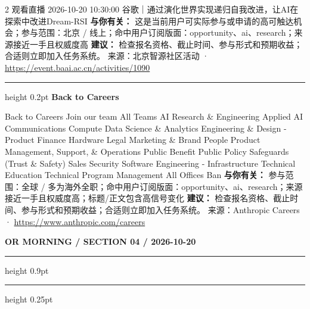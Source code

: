 \documentclass[10.5pt]{ctexart}
\begin{document}
\begin{multicols}{2}
观看直播 2026-10-20 10:30:00 谷歌｜通过演化世界实现递归自我改进，让AI在探索中改进Dream-RSI
\textbf{与你有关：} 这是当前用户可实际参与或申请的高可触达机会；参与范围：北京 / 线上；命中用户订阅版面：opportunity、ai、research；来源接近一手且权威度高
\textbf{建议：} 检查报名资格、截止时间、参与形式和预期收益；合适则立即加入任务系统。
{\footnotesize\color{ormuted} 来源：北京智源社区活动 · \url{https://event.baai.ac.cn/activities/1090}}
\vspace{2mm}
\hrule height 0.2pt
\vspace{2mm}
{\large\bfseries Back to Careers}\par
Back to Careers Join our team All Teams AI Research \& Engineering Applied AI Communications Compute Data Science \& Analytics Engineering \& Design - Product Finance Hardware Legal Marketing \& Brand People Product Management, Support, \& Operations Public Benefit Public Policy Safeguards (Trust \& Safety) Sales Security Software Engineering - Infrastructure Technical Education Technical Program Management All Offices Ban
\textbf{与你有关：} 参与范围：全球 / 多为海外全职；命中用户订阅版面：opportunity、ai、research；来源接近一手且权威度高；标题/正文包含高信号变化
\textbf{建议：} 检查报名资格、截止时间、参与形式和预期收益；合适则立即加入任务系统。
{\footnotesize\color{ormuted} 来源：Anthropic Careers · \url{https://www.anthropic.com/careers}}
\end{multicols}
\newpage
{\small\bfseries OR MORNING / SECTION 04 / 2026-10-20}
\vspace{2mm}
\hrule height 0.9pt
\vspace{1.5mm}
\hrule height 0.25pt
\vspace{4mm}
\end{document}
